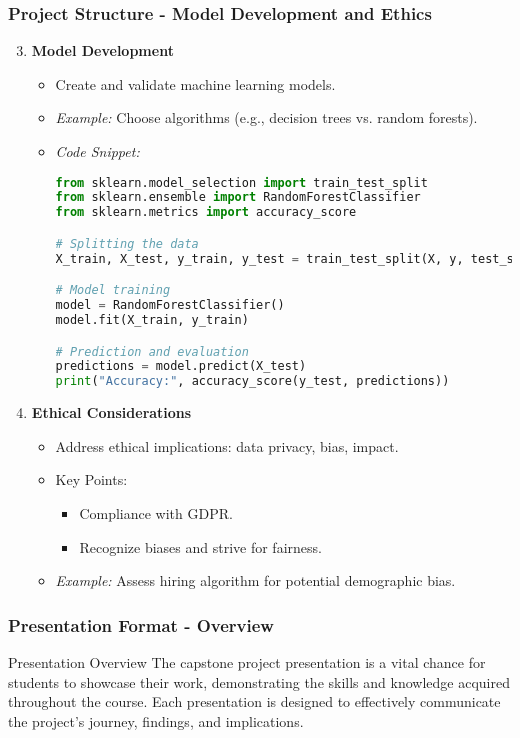\documentclass{beamer}
\begin{document}
\begin{frame}[fragile]
    \frametitle{Project Structure - Model Development and Ethics}
    \begin{enumerate}
        \setcounter{enumi}{2}
        \item \textbf{Model Development}
        \begin{itemize}
            \item Create and validate machine learning models.
            \item \textit{Example:} Choose algorithms (e.g., decision trees vs. random forests).
            \item \textit{Code Snippet:}
            \begin{lstlisting}[language=Python]
from sklearn.model_selection import train_test_split
from sklearn.ensemble import RandomForestClassifier
from sklearn.metrics import accuracy_score

# Splitting the data
X_train, X_test, y_train, y_test = train_test_split(X, y, test_size=0.2)

# Model training
model = RandomForestClassifier()
model.fit(X_train, y_train)

# Prediction and evaluation
predictions = model.predict(X_test)
print("Accuracy:", accuracy_score(y_test, predictions))
            \end{lstlisting}
        \end{itemize}

        \item \textbf{Ethical Considerations}
        \begin{itemize}
            \item Address ethical implications: data privacy, bias, impact.
            \item Key Points:
                \begin{itemize}
                    \item Compliance with GDPR.
                    \item Recognize biases and strive for fairness.
                \end{itemize}
            \item \textit{Example:} Assess hiring algorithm for potential demographic bias.
        \end{itemize}
    \end{enumerate}
\end{frame}

\begin{frame}[fragile]
    \frametitle{Presentation Format - Overview}
    \begin{block}{Presentation Overview}
        The capstone project presentation is a vital chance for students to showcase their work, demonstrating the skills and knowledge acquired throughout the course. Each presentation is designed to effectively communicate the project's journey, findings, and implications.
    \end{block}
\end{frame}
\end{document}
